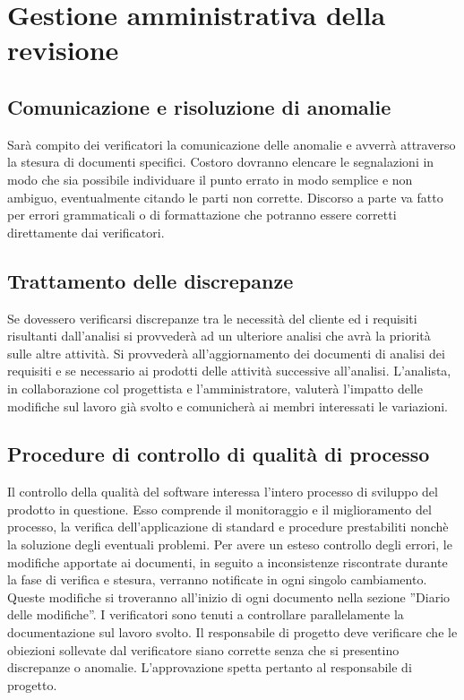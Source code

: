 \documentclass[11pt,titlepage,a4paper]{report}
\begin{document}
\chapter[Gestione revisione]{Gestione amministrativa della revisione} 

\section{Comunicazione e risoluzione di anomalie}
Sar\`a compito dei verificatori la comunicazione delle anomalie e avverr\`a attraverso la stesura di documenti specifici. Costoro dovranno elencare le segnalazioni in modo che sia possibile individuare il punto errato in modo semplice e non ambiguo, eventualmente citando le parti non corrette. Discorso a parte va fatto per errori grammaticali o di formattazione che potranno essere corretti direttamente dai verificatori.

\section{Trattamento delle discrepanze} 
Se dovessero verificarsi discrepanze tra le necessit\`a del cliente ed i requisiti risultanti dall'analisi si provveder\`a ad un ulteriore analisi che avr\`a la priorit\`a sulle altre attivit\`a. Si provveder\`a all'aggiornamento dei documenti di analisi dei requisiti e se necessario ai prodotti delle attivit\`a successive all'analisi. L'analista, in collaborazione col progettista e l'amministratore, valuter\`a l'impatto delle modifiche sul lavoro gi\`a svolto e comunicher\`a ai membri interessati le variazioni.

\section{Procedure di controllo di qualit\`a di processo}
Il controllo della qualit\`a del software interessa l'intero processo di sviluppo del prodotto in questione. Esso comprende il monitoraggio e il miglioramento del processo, la verifica dell'applicazione di standard e procedure prestabiliti nonch\`e la soluzione degli eventuali problemi.
Per avere un esteso controllo degli errori, le modifiche apportate ai documenti, in seguito a inconsistenze riscontrate durante la fase di verifica e stesura, verranno notificate in ogni singolo cambiamento. Queste modifiche si troveranno all'inizio di ogni documento nella sezione ''Diario delle modifiche''. I verificatori sono tenuti a controllare parallelamente la documentazione sul lavoro svolto. Il responsabile di progetto deve verificare che le obiezioni sollevate dal verificatore siano corrette senza che si presentino discrepanze o anomalie. L'approvazione spetta pertanto al responsabile di progetto.
\end{document}
